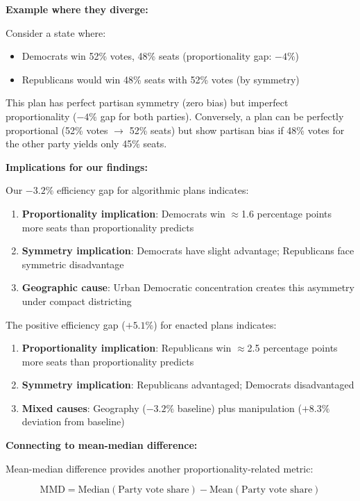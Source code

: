\textbf{Example where they diverge:}

Consider a state where:
\begin{itemize}
    \item Democrats win 52\% votes, 48\% seats (proportionality gap: $-4\%$)
    \item Republicans would win 48\% seats with 52\% votes (by symmetry)
\end{itemize}

This plan has perfect partisan symmetry (zero bias) but imperfect proportionality ($-4\%$ gap for both parties). Conversely, a plan can be perfectly proportional (52\% votes $\rightarrow$ 52\% seats) but show partisan bias if 48\% votes for the other party yields only 45\% seats.

\textbf{Implications for our findings:}

Our $-3.2\%$ efficiency gap for algorithmic plans indicates:
\begin{enumerate}
    \item \textbf{Proportionality implication}: Democrats win $\approx$1.6 percentage points more seats than proportionality predicts
    \item \textbf{Symmetry implication}: Democrats have slight advantage; Republicans face symmetric disadvantage
    \item \textbf{Geographic cause}: Urban Democratic concentration creates this asymmetry under compact districting
\end{enumerate}

The positive efficiency gap ($+5.1\%$) for enacted plans indicates:
\begin{enumerate}
    \item \textbf{Proportionality implication}: Republicans win $\approx$2.5 percentage points more seats than proportionality predicts
    \item \textbf{Symmetry implication}: Republicans advantaged; Democrats disadvantaged
    \item \textbf{Mixed causes}: Geography ($-3.2\%$ baseline) plus manipulation ($+8.3\%$ deviation from baseline)
\end{enumerate}

\textbf{Connecting to mean-median difference:}

Mean-median difference provides another proportionality-related metric:

\begin{equation}
\text{MMD} = \text{Median}(\text{Party vote share}) - \text{Mean}(\text{Party vote share})
\end{equation}


